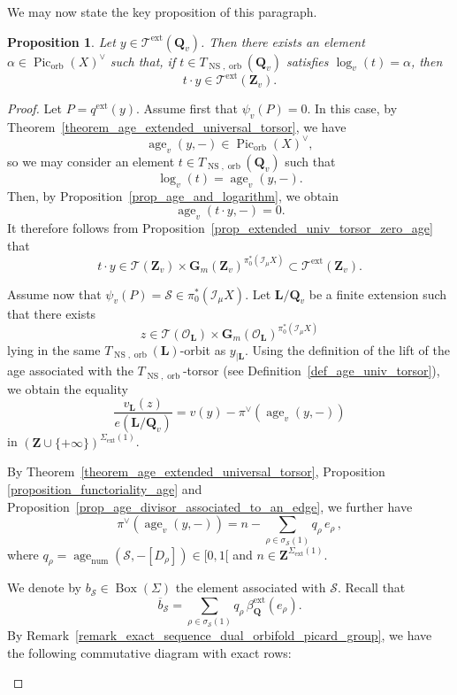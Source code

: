 \documentclass{proc-l}
\newcommand{\Z}{\mathbf{Z}}
\newcommand{\Q}{\mathbf{Q}}
\newcommand{\Le}{\mathbf{L}}
\newcommand{\G}{\mathbf{G}}
\DeclareMathOperator{\Pic}{Pic}
\DeclareMathOperator{\num}{num}
\DeclareMathOperator{\age}{age}
\DeclareMathOperator{\NS}{NS}
\DeclareMathOperator{\orb}{orb}
\DeclareMathOperator{\Boxe}{Box}
\DeclareMathOperator{\ext}{ext}
\newcommand{\stackS}{\mathcal{S}}
\newcommand{\stackT}{\mathcal{T}}
\newcommand{\sheafI}{\mathcal{I}}
\newcommand{\sheafO}{\mathcal{O}}
\newcommand{\twistsector}{\pi_0^*(\sheafI_{\mu} X)}
\newtheorem{prop}[theorem]{Proposition}
\theoremstyle{definition}
\theoremstyle{remark}
\numberwithin{equation}{section}
\begin{document}
We may now state the key proposition of this paragraph.

\begin{prop}\label{prop_surjectivite_local_extended_quotient_description}
Let $y \in \stackT^{\ext}(\Q_v)$. Then there exists an element
$\alpha \in \Pic_{\orb}(X)^{\vee}$ such that, if
$t \in T_{\NS,\orb}(\Q_v)$ satisfies $\log_v(t) = \alpha$, then
\[
t \cdot y \in \stackT^{\ext}(\Z_v).
\]
\end{prop}


\begin{proof}
Let $P = q^{\ext}(y)$. Assume first that $\psi_v(P) = 0$. In this case, by Theorem~\ref{theorem_age_extended_universal_torsor}, we have
\[
\age_v(y,-) \in \Pic_{\orb}(X)^{\vee},
\]
so we may consider an element $t \in T_{\NS,\orb}(\Q_v)$ such that
\[
\log_v(t) = \age_v(y,-).
\]
Then, by Proposition~\ref{prop_age_and_logarithm}, we obtain
\[
\age_v(t \cdot y,-) = 0.
\]
It therefore follows from Proposition~\ref{prop_extended_univ_torsor_zero_age} that
\[
t \cdot y \in \stackT(\Z_v) \times \G_m(\Z_v)^{\twistsector} \subset \stackT^{\ext}(\Z_v).
\]

Assume now that $\psi_v(P) = \stackS \in \twistsector$. Let $\Le/\Q_v$ be a finite extension such that there exists
\[
z \in \stackT(\sheafO_{\Le}) \times \G_m(\sheafO_{\Le})^{\twistsector}
\]
lying in the same $T_{\NS,\orb}(\Le)$-orbit as $y_{|\Le}$. Using the definition of the lift of the age associated with the $T_{\NS,\orb}$-torsor (see Definition~\ref{def_age_univ_torsor}), we obtain the equality
\[
\frac{v_{\Le}(z)}{e(\Le/\Q_v)}
=
v(y) - \pi^{\vee}(\age_v(y,-)) 
\]
in $\left( \Z \cup \{+\infty\} \right)^{\Sigma_{\ext}(1)}$.

By
Theorem~\ref{theorem_age_extended_universal_torsor}, Proposition \ref{proposition_functoriality_age} and
Proposition~\ref{prop_age_divisor_associated_to_an_edge}, we further have
\begin{equation}\label{equation_computation_value_n}
\pi^{\vee}\!\left( \age_v(y,-) \right)
=
n - \sum_{\rho \in \sigma_\stackS(1)} q_{\rho}\, e_{\rho} \, ,   
\end{equation}where
$q_{\rho} = \age_{\num}\!\left(\stackS,-[D_{\rho}]\right) \in [0,1[$ and
$n \in \Z^{\Sigma_{\ext}(1)}$.

We denote by $b_{\stackS} \in \Boxe(\Sigma)$ the element associated with $\stackS$.
Recall that
\[
\overline b_{\stackS}
=
\sum_{\rho \in \sigma_\stackS(1)} q_{\rho}\, \beta^{\ext}_{\Q}(e_{\rho}).
\]
By Remark~\ref{remark_exact_sequence_dual_orbifold_picard_group}, we have the following
commutative diagram with exact rows:
\begin{center}
\end{center}


\end{proof}
\end{document}
